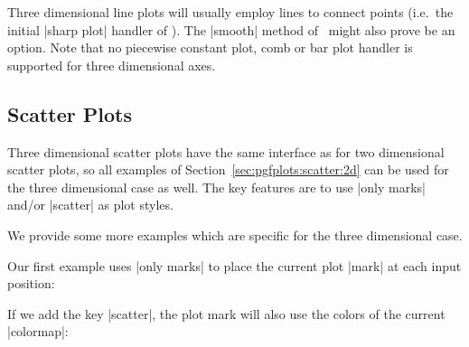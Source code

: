 {Three dimensional line plots will usually employ lines to connect points (i.e.\ the initial |sharp plot| handler of \Tikz). The |smooth| method of \Tikz\ might also prove be an option. Note that no piecewise constant plot, comb or bar plot handler is supported for three dimensional axes.

\subsection{Scatter Plots}

Three dimensional scatter plots have the same interface as for two dimensional scatter plots, so all examples of Section~\ref{sec:pgfplots:scatter:2d} can be used for the three dimensional case as well. 
The key features are to use |only marks| and/or |scatter| as plot styles. 

We provide some more examples which are specific for the three dimensional case.

Our first example uses |only marks| to place the current plot |mark| at each input position:
\pgfplotsexpensiveexample
\begin{codeexample}[]
\end{codeexample}

If we add the key |scatter|, the plot mark will also use the colors of the current |colormap|:
\pgfplotsexpensiveexample
\begin{codeexample}[]
\end{codeexample}

}
